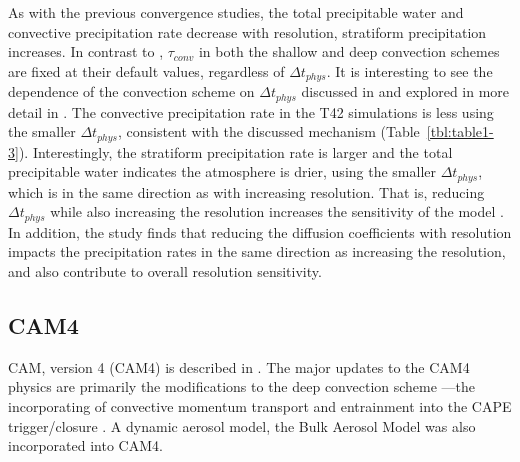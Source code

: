 As with the previous convergence studies, the total precipitable water and convective precipitation rate decrease with resolution, stratiform precipitation increases. In contrast to \cite{WETAL1995CD}, $\tau_{conv}$ in both the shallow and deep convection schemes are fixed at their default values, regardless of $\Delta t_{phys}$. It is interesting to see the dependence of the convection scheme on $\Delta t_{phys}$ discussed in \cite{WETAL1995CD} and explored in more detail in \cite{W2013QJRMS}. The convective precipitation rate in the T42 simulations is less using the smaller $\Delta t_{phys}$, consistent with the discussed mechanism (Table~\ref{tbl:table1-3}). Interestingly, the stratiform precipitation rate is larger and the total precipitable water indicates the atmosphere is drier, using the smaller $\Delta t_{phys}$, which is in the same direction as with increasing resolution. That is, reducing $\Delta t_{phys}$ while also increasing the resolution increases the sensitivity of the model \cite{W2008TELLUS}. In addition, the study finds that reducing the diffusion coefficients with resolution impacts the precipitation rates in the same direction as increasing the resolution, and also contribute to overall resolution sensitivity.
 
\subsection{CAM4}

CAM, version 4 (CAM4) is described in \cite{CAM4}. The major updates to the CAM4 physics are primarily the modifications to the deep convection scheme \citep{ZM1995AO} ---the incorporating of convective momentum transport \citep{RR2008JC} and entrainment into the CAPE trigger/closure \citep{RB1992JAS,NRJ2008JC}. A dynamic aerosol model, the Bulk Aerosol Model was also incorporated into CAM4.

